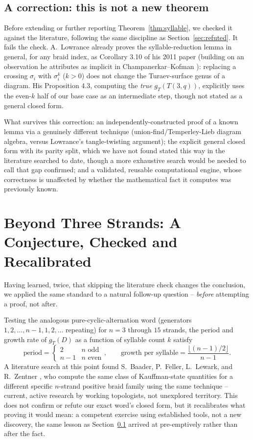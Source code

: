 \documentclass[11pt]{article}
\theoremstyle{definition}
\begin{document}
\subsection{A correction: this is not a new theorem}
\label{sec:correction}

Before extending or further reporting Theorem~\ref{thm:syllable}, we checked it against the literature, following the same discipline as Section~\ref{sec:refuted}. It fails the check. A.~Lowrance \cite{lowrance2011} already proves the syllable-reduction lemma in general, for any braid index, as Corollary 3.10 of his 2011 paper (building on an observation he attributes as implicit in Champanerkar--Kofman \cite{champanerkarkofman2007}): replacing a crossing $\sigma_i$ with $\sigma_i^k$ ($k>0$) does not change the Turaev-surface genus of a diagram. His Proposition 4.3, computing the \emph{true} $g_T(T(3,q))$, explicitly uses the even-$k$ half of our base case as an intermediate step, though not stated as a general closed form.

What survives this correction: an independently-constructed proof of a known lemma via a genuinely different technique (union-find/Temperley-Lieb diagram algebra, versus Lowrance's tangle-twisting argument); the explicit general closed form with its parity split, which we have not found stated this way in the literature searched to date, though a more exhaustive search would be needed to call that gap confirmed; and a validated, reusable computational engine, whose correctness is unaffected by whether the mathematical fact it computes was previously known.

\section{Beyond Three Strands: A Conjecture, Checked and Recalibrated}
\label{sec:conjecture}

Having learned, twice, that skipping the literature check changes the conclusion, we applied the same standard to a natural follow-up question -- \emph{before} attempting a proof, not after.

Testing the analogous pure-cyclic-alternation word (generators $1, 2, \ldots, n-1, 1, 2, \ldots$ repeating) for $n = 3$ through $15$ strands, the period and growth rate of $g_T(D)$ as a function of syllable count $k$ satisfy
\[
\text{period} = \begin{cases} 2 & n \text{ odd} \\ n-1 & n \text{ even} \end{cases}, \qquad
\text{growth per syllable} = \frac{\lfloor (n-1)/2 \rfloor}{n-1}.
\]
A literature search at this point found S.~Baader, P.~Feller, L.~Lewark, and R.~Zentner \cite{bflz2020}, who compute the same class of Kauffman-state quantities for a different specific $n$-strand positive braid family using the same technique -- current, active research by working topologists, not unexplored territory. This does not confirm or refute our exact word's closed form, but it recalibrates what proving it would mean: a competent exercise using established tools, not a new discovery, the same lesson as Section~\ref{sec:correction} arrived at pre-emptively rather than after the fact.
\end{document}
